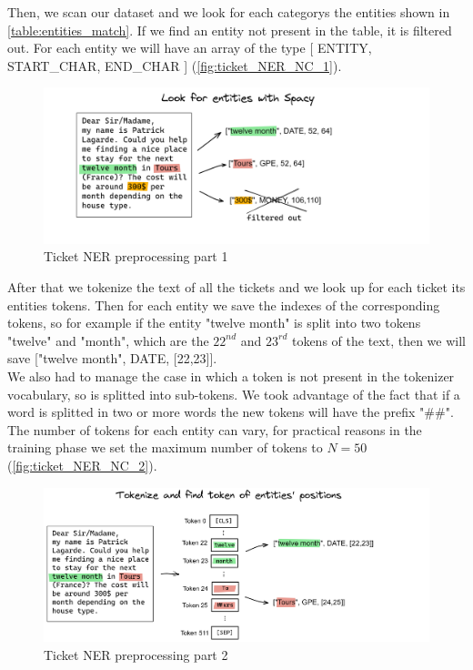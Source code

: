 Then, we scan our dataset and we look for each categorys the entities shown in \autoref{table:entities_match}. If we find an entity not present in the table, it is filtered out. For each entity we will have an array of the type [ ENTITY, START\_CHAR, END\_CHAR ] (\autoref{fig:ticket_NER_NC_1}).\\
\begin{figure}[h] 
    \includegraphics[width=\textwidth]{images/NER_nc_1.png}
    \caption{Ticket NER preprocessing part 1}
    \label{fig:ticket_NER_NC_1}
\end{figure}    
After that we tokenize the text of all the tickets and we look up for each ticket its entities tokens. Then for each entity we save the indexes of the corresponding tokens, so for example if the entity "twelve month" is split into two tokens "twelve" and "month", which are the $22^{nd}$ and $23^{rd}$ tokens of the text, then we will save ["twelve month", DATE, [22,23]]. \\
We also had to manage the case in which a token is not present in the tokenizer vocabulary, so is splitted into sub-tokens. We took advantage of the fact that if a word is splitted in two or more words the new tokens will have the prefix "\#\#". \\
The number of tokens for each entity can vary, for practical reasons in the training phase we set the maximum number of tokens to $N=50$ (\autoref{fig:ticket_NER_NC_2}).
\begin{figure}[h] 
    \includegraphics[width=\textwidth]{images/NER_nc_2.png}
    \caption{Ticket NER preprocessing part 2}
    \label{fig:ticket_NER_NC_2}
\end{figure}    

